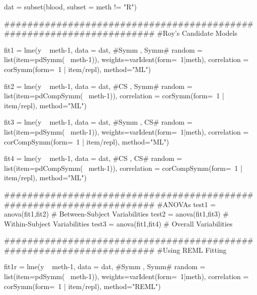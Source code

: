 dat = subset(blood, subset = meth != "R")

#####################################################################
#Roy's Candidate Models

    
fit1 = lme(y ~ meth-1, data = dat,   #Symm , Symm#
    random = list(item=pdSymm(~ meth-1)), 
    weights=varIdent(form=~1|meth),
    correlation = corSymm(form=~1 | item/repl), 
    method="ML")
    
fit2 = lme(y ~ meth-1, data = dat,   #CS , Symm#
    random = list(item=pdCompSymm(~ meth-1)),
    correlation = corSymm(form=~1 | item/repl), 
    method="ML")
    
fit3 = lme(y ~ meth-1, data = dat,   #Symm , CS# 
    random = list(item=pdSymm(~ meth-1)),
    weights=varIdent(form=~1|meth), 
    correlation = corCompSymm(form=~1 | item/repl), 
    method="ML")
    
fit4 = lme(y ~ meth-1, data = dat,   #CS , CS# 
    random = list(item=pdCompSymm(~ meth-1)), 
    correlation = corCompSymm(form=~1 | item/repl), 
    method="ML")
    
#####################################################################
#ANOVAs
test1 = anova(fit1,fit2) # Between-Subject Variabilities
test2 = anova(fit1,fit3) # Within-Subject Variabilities
test3 = anova(fit1,fit4) # Overall Variabilities


#####################################################################
#Using REML Fitting


fit1r = lme(y ~ meth-1, data = dat,   #Symm , Symm#
    random = list(item=pdSymm(~ meth-1)), 
    weights=varIdent(form=~1|meth),
    correlation = corSymm(form=~1 | item/repl), 
    method="REML")
    
 

